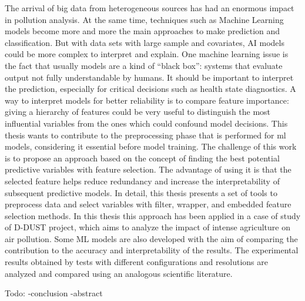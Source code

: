 The arrival of big data from heterogeneous sources has had an enormous impact in pollution analysis.
At the same time, techniques such as Machine Learning models become more and more the main approaches to make prediction and classification.
But with data sets with large sample and covariates, AI models could be more complex to interpret and explain.
One machine learning issue is the fact that usually models are a kind of “black box”: systems that evaluate output not fully understandable by humans. 
It should be important to interpret the prediction, especially for critical decisions such as health state diagnostics.
A way to interpret models for better reliability is to compare feature importance: giving a hierarchy of features could be very useful to distinguish the most influential variables from the ones which could confound model decisions.
This thesis wants to contribute to the preprocessing phase that is performed for \gls{ml} models, considering it essential before model training.
The challenge of this work is to propose an approach based on the concept of finding the best potential predictive variables with feature selection.
The advantage of using it is that the selected feature helps reduce redundancy and increase the interpretability of subsequent predictive models.
In detail, this thesis presents a set of tools to preprocess data and select variables with filter, wrapper, and embedded feature selection methods.
In this thesis this approach has been applied in a case of study of D-DUST project, which aims to analyze the impact of intense agriculture on air pollution.
Some ML models are also developed with the aim of comparing the contribution to the accuracy and interpretability of the results.
The experimental results obtained by tests with different configurations and resolutions are analyzed and compared using an analogous scientific literature.


Todo:
-conclusion 
-abstract
